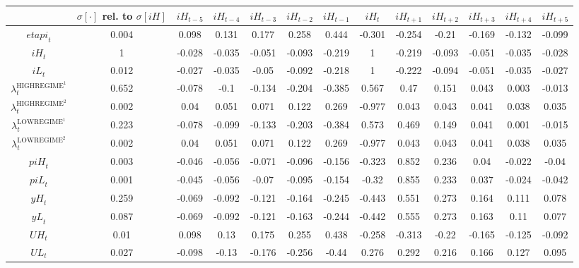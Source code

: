 \begin{tabular}{c|c|c|c|c|c|c|c|c|c|c|c|c|}
  & $\sigma[\cdot]$ rel. to $\sigma[{i\!H}]$ & ${i\!H}_{t-5}$ & ${i\!H}_{t-4}$ & ${i\!H}_{t-3}$ & ${i\!H}_{t-2}$ & ${i\!H}_{t-1}$ & ${i\!H}_{t}$ & ${i\!H}_{t+1}$ & ${i\!H}_{t+2}$ & ${i\!H}_{t+3}$ & ${i\!H}_{t+4}$ & ${i\!H}_{t+5}$\\
\hline
${e\!t\!a\!p\!i}_{t}$ & 0.004 & 0.098 & 0.131 & 0.177 & 0.258 & 0.444 & -0.301 & -0.254 & -0.21 & -0.169 & -0.132 & -0.099 \\
${i\!H}_{t}$ & 1 & -0.028 & -0.035 & -0.051 & -0.093 & -0.219 & 1 & -0.219 & -0.093 & -0.051 & -0.035 & -0.028 \\
${i\!L}_{t}$ & 0.012 & -0.027 & -0.035 & -0.05 & -0.092 & -0.218 & 1 & -0.222 & -0.094 & -0.051 & -0.035 & -0.027 \\
$\lambda^{\mathrm{HIGHREGIME}^{\mathrm{1}}}_{t}$ & 0.652 & -0.078 & -0.1 & -0.134 & -0.204 & -0.385 & 0.567 & 0.47 & 0.151 & 0.043 & 0.003 & -0.013 \\
$\lambda^{\mathrm{HIGHREGIME}^{\mathrm{2}}}_{t}$ & 0.002 & 0.04 & 0.051 & 0.071 & 0.122 & 0.269 & -0.977 & 0.043 & 0.043 & 0.041 & 0.038 & 0.035 \\
$\lambda^{\mathrm{LOWREGIME}^{\mathrm{1}}}_{t}$ & 0.223 & -0.078 & -0.099 & -0.133 & -0.203 & -0.384 & 0.573 & 0.469 & 0.149 & 0.041 & 0.001 & -0.015 \\
$\lambda^{\mathrm{LOWREGIME}^{\mathrm{2}}}_{t}$ & 0.002 & 0.04 & 0.051 & 0.071 & 0.122 & 0.269 & -0.977 & 0.043 & 0.043 & 0.041 & 0.038 & 0.035 \\
${p\!i\!H}_{t}$ & 0.003 & -0.046 & -0.056 & -0.071 & -0.096 & -0.156 & -0.323 & 0.852 & 0.236 & 0.04 & -0.022 & -0.04 \\
${p\!i\!L}_{t}$ & 0.001 & -0.045 & -0.056 & -0.07 & -0.095 & -0.154 & -0.32 & 0.855 & 0.233 & 0.037 & -0.024 & -0.042 \\
${y\!H}_{t}$ & 0.259 & -0.069 & -0.092 & -0.121 & -0.164 & -0.245 & -0.443 & 0.551 & 0.273 & 0.164 & 0.111 & 0.078 \\
${y\!L}_{t}$ & 0.087 & -0.069 & -0.092 & -0.121 & -0.163 & -0.244 & -0.442 & 0.555 & 0.273 & 0.163 & 0.11 & 0.077 \\
${U\!H}_{t}$ & 0.01 & 0.098 & 0.13 & 0.175 & 0.255 & 0.438 & -0.258 & -0.313 & -0.22 & -0.165 & -0.125 & -0.092 \\
${U\!L}_{t}$ & 0.027 & -0.098 & -0.13 & -0.176 & -0.256 & -0.44 & 0.276 & 0.292 & 0.216 & 0.166 & 0.127 & 0.095 \\
\hline
\end{tabular}


